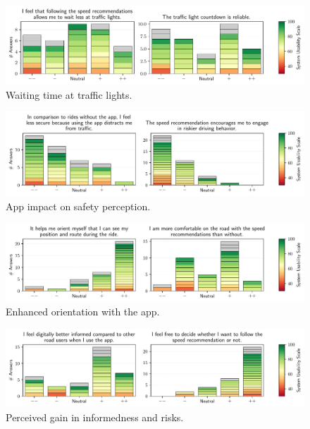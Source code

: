 \begin{figure}[t]
\caption{Waiting time at traffic lights.}\label{fig:waiting-time-at-traffic-lights}
\includegraphics[width=\linewidth]{images/app-usability-questions-waiting-time-at-traffic-lights.pdf}
\end{figure}
          

\begin{figure}[t]
\caption{App impact on safety perception.}\label{fig:app-impact-on-safety}
\includegraphics[width=\linewidth]{images/app-usability-questions-app-impact-on-safety.pdf}
\end{figure}
          

\begin{figure}[t]
\caption{Enhanced orientation with the app.}\label{fig:app-enhanced-orientation}
\includegraphics[width=\linewidth]{images/app-usability-questions-app-enhanced-orientation.pdf}
\end{figure}
          

\begin{figure}[t]
\caption{Perceived gain in informedness and risks.}\label{fig:app-informedness-freedom}
\includegraphics[width=\linewidth]{images/app-usability-questions-app-informedness-freedom.pdf}
\end{figure}

